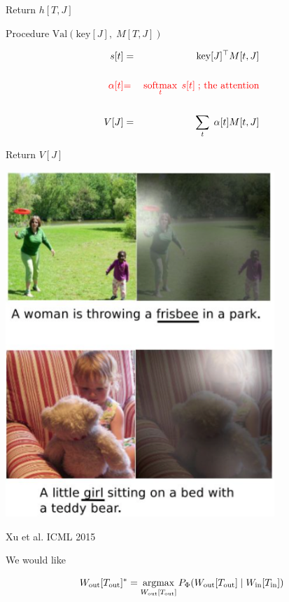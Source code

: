 {\vfill
Return $h[T,J]$


Procedure $\mathrm{Val}(\mathrm{key}[J],\;M[T,J])$

\bigskip
\begin{eqnarray*}
s[t] & = &\mathrm{key}[J]^\top M[t,J] \\
\\
{\color{red} \alpha[t]} & {\color{red} =} & {\color{red} \operatorname*{softmax}_t \;s[t]\;\mbox{; the attention}} \\
\\
V[J] &= & \sum_t\;\alpha[t]M[t,J]
\end{eqnarray*}

\bigskip
Return $V[J]$




\centerline{\includegraphics[width = 4in]{../images/AttentionInCaptioning1}}
\centerline{Xu et al. ICML 2015}


We would like

\vfill
$$W_{\mathrm{out}}[T_{\mathrm{out}}]^* = \operatorname*{argmax}_{W_{\mathrm{out}}[T_{\mathrm{out}}]}
P_\Phi(W_{\mathrm{out}}[T_{\mathrm{out}}] \;|\;W_{\mathrm{in}}[T_{\mathrm{in}}])$$

}
